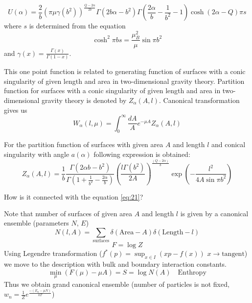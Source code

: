 \documentclass[12pt]{article}
\begin{document}
\begin{equation}
  \label{eq:21}
  U(\alpha)=\frac{2}{b}\left(\pi\mu\gamma( b^{2})\right)^{\frac{Q-2\alpha}{2b}} \Gamma(2b\alpha-b^{2})
  \Gamma\left(\frac{2\alpha}{b}-\frac{1}{b^{2}}-1\right) \cosh (2\alpha-Q)\pi s
\end{equation}
where $s$ is determined from the equation
\begin{equation}
  \label{eq:23}
  \cosh^{2} \pi b s=\frac{\mu_{B}^{2}}{\mu}\sin \pi b^{2}
\end{equation}
and $\gamma(x)=\frac{\Gamma(x)}{\Gamma(1-x)}$.


This one point function is related to generating function of surfaces with a conic singularity of given length and area in
two-dimensional gravity theory. 
Partition function for  surfaces with a conic singularity of given length and area in
two-dimensional gravity theory is denoted by $Z_{\alpha}(A,l)$. Canonical transformation gives us
\begin{equation}
  \label{eq:24}
  W_{\alpha}(l,\mu)=\int_{0}^{\infty} \frac{dA}{A} e^{-\mu A}Z_{\alpha}(A,l)
\end{equation}

For the partition function of surfaces with given area $A$ and length $l$ and conical singularity
with angle $a(\alpha)$ following expression is obtained:
\begin{equation}
  \label{eq:29}
  Z_{\alpha}(A,l)=\frac{1}{b}\frac{\Gamma(2\alpha b
    -b^{2})}{\Gamma\left(1+\frac{1}{b^{2}}-\frac{2\alpha}{b}\right)} \left(\frac{l\Gamma(b^{2})}{2
      A}\right)^{\frac{(Q-2\alpha)}{b}} \exp\left(-\frac{l^{2}}{4 A \sin \pi b^{2}}\right)
\end{equation}

How is it connected with the equation \eqref{eq:21}?

Note that number of surfaces of given area $A$ and length $l$ is given by a canonical ensemble
(parameters $N$, $E$)
\begin{equation}
  \label{eq:25}
  N(l,A) = \sum_{\mbox{surfaces}} \delta(\mbox{Area}-A)\delta(\mbox{Length}-l)
\end{equation}
\begin{equation}
  \label{eq:26}
  F=\log Z
\end{equation}
Using Legendre transformation ($f^{*}(p)=\sup_{x\in I} (xp - f(x))$ $x\to \mbox{tangent}$) we move
to the description with bulk and boundary interaction constants. 
\begin{equation}
  \label{eq:27}
  \min_{\mu}(F(\mu)-\mu A) = S = \log N(A) \quad \mbox{Enthropy}
\end{equation}
Thus we obtain grand canonical ensemble (number of particles is not fixed, $w_{n}=\frac{1}{Z}
e^{\frac{-(E_{n}-\mu N)}{kT}}$)
\end{document}
